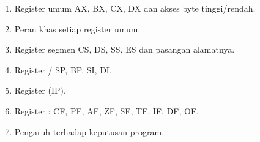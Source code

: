 \documentclass[../../main.tex]{subfiles}
\begin{document}
\begin{materibox}
\vspace{1.1em}
\begin{enumerate}
    \item Register umum AX, BX, CX, DX dan akses byte tinggi/rendah.
    \item Peran khas setiap register umum.
    \item Register segmen CS, DS, SS, ES dan pasangan alamatnya.
    \item Register / SP, BP, SI, DI.
    \item Register  (IP).
    \item Register : CF, PF, AF, ZF, SF, TF, IF, DF, OF.
    \item Pengaruh  terhadap keputusan program.
\end{enumerate}
\end{materibox}










\end{document}
